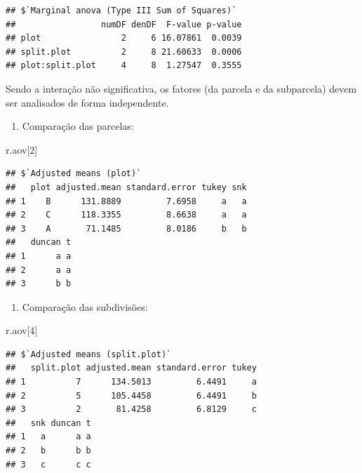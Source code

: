 \documentclass[
]{article}
\newenvironment{Shaded}{\begin{snugshade}}{\end{snugshade}}
\newcommand{\DecValTok}[1]{\textcolor[rgb]{0.00,0.00,0.81}{#1}}
\newcommand{\NormalTok}[1]{#1}
\providecommand{\tightlist}{%
  \setlength{\itemsep}{0pt}\setlength{\parskip}{0pt}}
\begin{document}
\begin{verbatim}
## $`Marginal anova (Type III Sum of Squares)`
##                 numDF denDF  F-value p-value
## plot                2     6 16.07861  0.0039
## split.plot          2     8 21.60633  0.0006
## plot:split.plot     4     8  1.27547  0.3555
\end{verbatim}

Sendo a interação não significativa, os fatores (da parcela e da subparcela) devem ser analisados de forma independente.

\begin{enumerate}
\def\labelenumi{\arabic{enumi}.}
\tightlist
\item
  Comparação das parcelas:
\end{enumerate}

\begin{Shaded}
\begin{Highlighting}[]
\NormalTok{r.aov[}\DecValTok{2}\NormalTok{]}
\end{Highlighting}
\end{Shaded}

\begin{verbatim}
## $`Adjusted means (plot)`
##   plot adjusted.mean standard.error tukey snk
## 1    B      131.8889         7.6958     a   a
## 2    C      118.3355         8.6638     a   a
## 3    A       71.1485         8.0186     b   b
##   duncan t
## 1      a a
## 2      a a
## 3      b b
\end{verbatim}

\begin{enumerate}
\def\labelenumi{\arabic{enumi}.}
\setcounter{enumi}{1}
\tightlist
\item
  Comparação das subdivisões:
\end{enumerate}

\begin{Shaded}
\begin{Highlighting}[]
\NormalTok{r.aov[}\DecValTok{4}\NormalTok{]}
\end{Highlighting}
\end{Shaded}

\begin{verbatim}
## $`Adjusted means (split.plot)`
##   split.plot adjusted.mean standard.error tukey
## 1          7      134.5013         6.4491     a
## 2          5      105.4458         6.4491     b
## 3          2       81.4258         6.8129     c
##   snk duncan t
## 1   a      a a
## 2   b      b b
## 3   c      c c
\end{verbatim}
\end{document}
